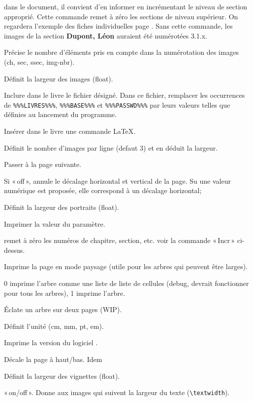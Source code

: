 \begin{description}[style=nextline]
dans le document, il convient d'en informer \gwtol{} en incrémentant
le niveau de section approprié. Cette commande remet à zéro les sections de
niveau supérieur. On regardera l'exemple des fiches individuelles
page \pageref{fiches}. Sans cette commande, les images de la section
{\bf Dupont, Léon} auraient été numérotées 3.1.x.
\item[ImageLabel] Précise le nombre d'éléments pris en compte dans
la numérotation des images (ch, sec, ssec, img-nbr).
\item[ImgWidth] Définit la largeur des images (float).
\item[Input] Inclure dans le livre le fichier désigné. Dans ce fichier,
remplacer les occurrences de \verb|%%%LIVRES%%%|, \verb|%%%BASE%%%| et
\verb|%%%PASSWD%%%| par leurs valeurs telles que définies au lancement du programme.
\item[LaTeX] Insérer dans le livre une commande \LaTeX{}.
\item[NbImgPerLine] Définit le nombre d'images par ligne (defaut 3) et en
déduit la largeur.
\item[Newpage] Passer à la page suivante.
\item[Offset] Si «\,off\,», annule le décalage horizontal et vertical de la page.
Su une valeur numérique est proposée, elle correspond à un décalage horizontal;
\item[PortraitWidth] Définit la largeur des portraits (float).
\item[Print] Imprimer la valeur du paramètre.
\item[Reset] remet à zéro les numéros de chapitre, section, etc.
voir la commande «\,Incr\,» ci-dessus.
\item[Sideways] Imprime la page en mode paysage (utile pour les arbres
qui peuvent être larges).\label{sideways}
\item[TreeMode] 0 imprime l'arbre comme une liste de liste de cellules
(debug, devrait fonctionner pour tous les arbres), 1 imprime l'arbre.
\item[TwoPages] Éclate un arbre sur deux pages (WIP).
\item[Unit] Définit l'unité (cm, mm, pt, em).
\item[Version] Imprime la version du logiciel \gwtol{}.
\item[Voffset] Décale la page à haut/bas. Idem
\item[VignWidth] Définit la largeur des vignettes (float).
\item[WideImages] «\,on/off\,». Donne aux images qui suivent la largeur du texte
(\verb|\textwidth|).

\end{description}

